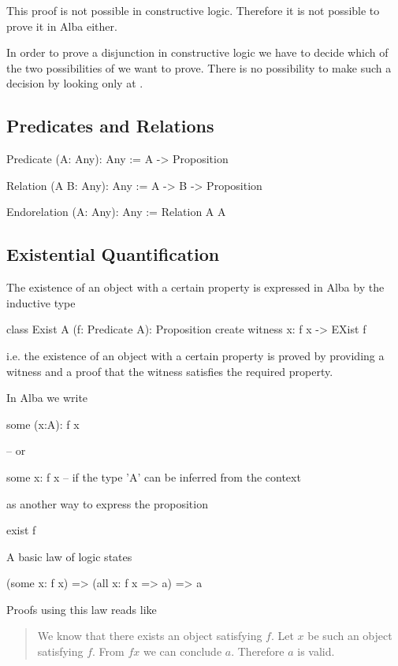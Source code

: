 This proof is not possible in constructive logic. Therefore it is not possible
to prove it in Alba either.

In order to prove a disjunction in constructive logic we have to decide which
of the two possibilities of  we want to prove. There is
no possibility to make such a decision by looking only at .






\subsection{Predicates and Relations}

\begin{alba}
    Predicate (A: Any): Any :=
        A -> Proposition

    Relation (A B: Any): Any :=
        A -> B -> Proposition

    Endorelation (A: Any): Any :=
        Relation A A
\end{alba}






\vskip 5mm
\subsection{Existential Quantification}


The existence of an object with a certain property is expressed in Alba by the
inductive type
%
\begin{alba}
    class
        Exist A (f: Predicate A): Proposition
    create
        witness x: f x -> EXist f
\end{alba}
%
i.e. the existence of an object with a certain property is proved by providing
a witness and a proof that the witness satisfies the required property.

In Alba we write
%
\begin{alba}
  some (x:A): f x

  -- or

  some x: f x   -- if the type 'A' can be inferred from the context
\end{alba}
%
as another way to express the proposition
%
\begin{alba}
  exist f
\end{alba}

A basic law of logic states
%
\begin{alba}
  (some x: f x) => (all x: f x => a) => a
\end{alba}
%
Proofs using this law reads like
\begin{quote}
  We know that there exists an object satisfying $f$. Let $x$ be such an
  object satisfying $f$. From $ f x$ we can conclude $a$. Therefore $a$ is
  valid.
\end{quote}

